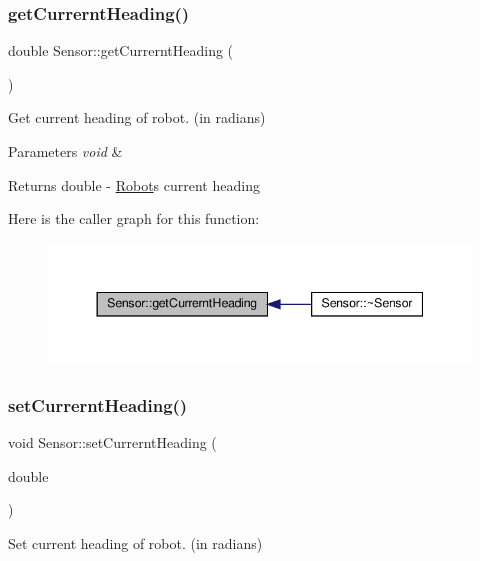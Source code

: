 \subsubsection{\texorpdfstring{get\+Currernt\+Heading()}{getCurrerntHeading()}}
{\footnotesize\ttfamily double Sensor\+::get\+Currernt\+Heading (\begin{DoxyParamCaption}{ }\end{DoxyParamCaption})}



Get current heading of robot. (in radians) 


\begin{DoxyParams}{Parameters}
{\em void} & \\
\hline
\end{DoxyParams}
\begin{DoxyReturn}{Returns}
double -\/ \hyperlink{classRobot}{Robot}\textquotesingle{}s current heading 
\end{DoxyReturn}
Here is the caller graph for this function\+:
\nopagebreak
\begin{figure}[H]
\begin{center}
\leavevmode
\includegraphics[width=344pt]{classSensor_a5bf3c3f5dfa3048bb702b5d3164bd410_icgraph}
\end{center}
\end{figure}
\mbox{\label{classSensor_ade56b78666a057ce576aad448a2a5ecd}} 
\subsubsection{\texorpdfstring{set\+Currernt\+Heading()}{setCurrerntHeading()}}
{\footnotesize\ttfamily void Sensor\+::set\+Currernt\+Heading (\begin{DoxyParamCaption}\item[{double}]{ }\end{DoxyParamCaption})}



Set current heading of robot. (in radians) 


